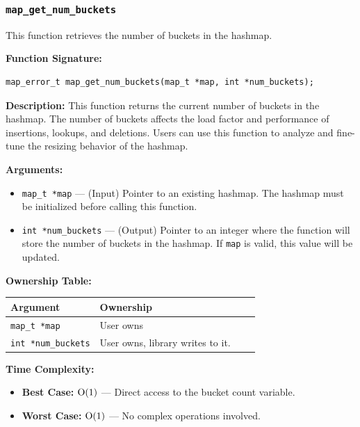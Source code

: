 \documentclass[titlepage]{article}
\begin{document}
\subsubsection{\texttt{map\_get\_num\_buckets}} %

This function retrieves the number of buckets in the hashmap.

\textbf{Function Signature:}
\begin{verbatim}
map_error_t map_get_num_buckets(map_t *map, int *num_buckets);
\end{verbatim}

\textbf{Description:}
This function returns the current number of buckets in the hashmap.
The number of buckets affects the load factor and performance of insertions, lookups, and deletions.
Users can use this function to analyze and fine-tune the resizing behavior of the hashmap.

\textbf{Arguments:}
\begin{itemize}
    \item \texttt{map\_t *map} --- (Input) Pointer to an existing hashmap.
    The hashmap must be initialized before calling this function.

    \item \texttt{int *num\_buckets} --- (Output) Pointer to an integer where the function will store the number of buckets in the hashmap.
    If \texttt{map} is valid, this value will be updated.
\end{itemize}

\textbf{Ownership Table:}
\begin{center}
\begin{tabular}{@{} l l c c @{} }
\toprule
\textbf{Argument} & \textbf{Ownership}  \\
\midrule
\texttt{map\_t *map} & User owns  \\
\texttt{int *num\_buckets} & User owns, library writes to it. \\
\bottomrule
\end{tabular}
\end{center}

\textbf{Time Complexity:}
\begin{itemize}
    \item \textbf{Best Case:} \( $O(1)$ \) --- Direct access to the bucket count variable.
    \item \textbf{Worst Case:} \( $O(1)$ \) --- No complex operations involved.
\end{itemize}
\end{document}

